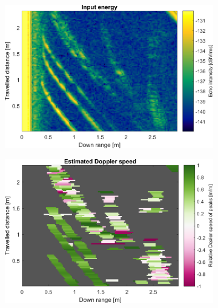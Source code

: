\begin{figure}[htbp]
    \centering
    \begin{subfigure}[t]{0.475\linewidth}
        \centering
        \includegraphics[width=\linewidth,max height=.475\textheight]{gfx/results/entryway_input.png}
    \end{subfigure}%
    \hfill%
    \begin{subfigure}[t]{0.475\linewidth}  
        \centering 
        \includegraphics[width=\linewidth,max height=.475\textheight]{gfx/results/entryway_doppler.png}
    \end{subfigure}\bigskip\\
    \begin{subfigure}[t]{0.5\linewidth}   
        \centering 

\end{subfigure}
\end{figure}
